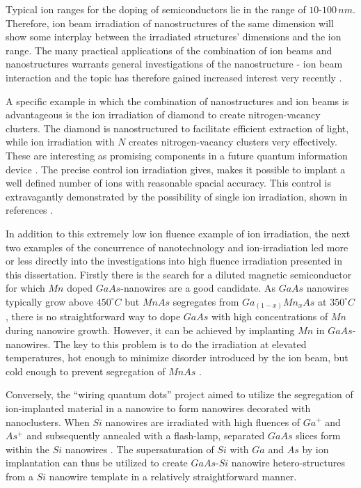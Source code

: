 Typical ion ranges for the doping of semiconductors lie in the range of $10$-$100\,nm$. Therefore, ion beam irradiation of nanostructures of the same dimension will show some interplay between the irradiated structures' dimensions and the ion range. The many practical applications of the combination of ion beams and nanostructures warrants general investigations of the nanostructure - ion beam interaction and the topic has therefore gained increased interest very recently \cite{borschel_ion-solid_2012,greaves_enhanced_2013,nietiadi_sputtering_2014,johannes_ion_2015,urbassek_sputter_2015}.  

A specific example in which the combination of nanostructures and ion beams is advantageous is the ion irradiation of diamond to create nitrogen-vacancy clusters. The diamond is nanostructured to facilitate efficient extraction of light, while ion irradiation with $N$ creates nitrogen-vacancy clusters very effectively. These are interesting as promising components in a future quantum information device \cite{babinec_diamond_2010}. The precise control ion irradiation gives, makes it possible to implant a well defined number of ions with reasonable spacial accuracy. This control is extravagantly demonstrated by the possibility of single ion irradiation, shown in references \cite{meijer_concept_2006,ohdomari_single-ion_2008}. 

In addition to this extremely low ion fluence example of ion irradiation, the next two examples of the concurrence of nanotechnology and ion-irradiation led more or less directly into the investigations into high fluence irradiation presented in this dissertation. Firstly there is the search for a diluted magnetic semiconductor for which $Mn$ doped $GaAs$-nanowires are a good candidate. As $GaAs$ nanowires typically grow above $450^\circ C$ but $MnAs$ segregates from $Ga_{(1-x)}Mn_xAs$ at $350^\circ C$ \cite{dietl_engineering_2006,sadowski_gaasmnas_2011}, there is no straightforward way to dope $GaAs$ with high concentrations of $Mn$ during nanowire growth. However, it can be achieved by implanting $Mn$ in $GaAs$-nanowires. The key to this problem is to do the irradiation at elevated temperatures, hot enough to minimize disorder introduced by the ion beam, but cold enough to prevent segregation of $MnAs$ \cite{borschel_new_2011,paschoal_hopping_2012,borschel_ion-solid_2012,kumar_magnetic_2013,paschoal_magnetoresistance_2014}. 

Conversely, the ``wiring quantum dots'' project aimed to utilize the segregation of ion-implanted material in a nanowire to form nanowires decorated with nanoclusters. When $Si$ nanowires are irradiated with high fluences of $Ga^+$ and $As^+$ and subsequently annealed with a flash-lamp, separated $GaAs$ slices form within the $Si$ nanowires \cite{prucnal_iii-v_2014,glaser_personal_2015}. The supersaturation of $Si$ with $Ga$ and $As$ by ion implantation can thus be utilized to create $GaAs$-$Si$ nanowire hetero-structures from a $Si$ nanowire template in a relatively straightforward manner.
 
